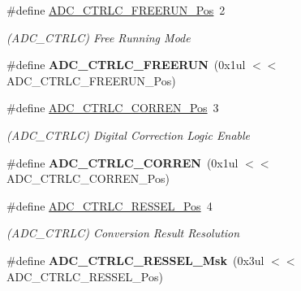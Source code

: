 \begin{DoxyCompactItemize}
\item 
\hypertarget{group___s_a_m_l21___a_d_c_gaf797b45fb63c9c66ebcf3eaa16721590}{}\#define \hyperlink{group___s_a_m_l21___a_d_c_gaf797b45fb63c9c66ebcf3eaa16721590}{A\+D\+C\+\_\+\+C\+T\+R\+L\+C\+\_\+\+F\+R\+E\+E\+R\+U\+N\+\_\+\+Pos}~2\label{group___s_a_m_l21___a_d_c_gaf797b45fb63c9c66ebcf3eaa16721590}

\begin{DoxyCompactList}\small\item\em (A\+D\+C\+\_\+\+C\+T\+R\+L\+C) Free Running Mode \end{DoxyCompactList}\item 
\hypertarget{group___s_a_m_l21___a_d_c_ga88d484b091ca0e7ee7945cc64b936b11}{}\#define {\bfseries A\+D\+C\+\_\+\+C\+T\+R\+L\+C\+\_\+\+F\+R\+E\+E\+R\+U\+N}~(0x1ul $<$$<$ A\+D\+C\+\_\+\+C\+T\+R\+L\+C\+\_\+\+F\+R\+E\+E\+R\+U\+N\+\_\+\+Pos)\label{group___s_a_m_l21___a_d_c_ga88d484b091ca0e7ee7945cc64b936b11}

\item 
\hypertarget{group___s_a_m_l21___a_d_c_ga432d3fdbfce5dd79a4eff17b3f8a2c50}{}\#define \hyperlink{group___s_a_m_l21___a_d_c_ga432d3fdbfce5dd79a4eff17b3f8a2c50}{A\+D\+C\+\_\+\+C\+T\+R\+L\+C\+\_\+\+C\+O\+R\+R\+E\+N\+\_\+\+Pos}~3\label{group___s_a_m_l21___a_d_c_ga432d3fdbfce5dd79a4eff17b3f8a2c50}

\begin{DoxyCompactList}\small\item\em (A\+D\+C\+\_\+\+C\+T\+R\+L\+C) Digital Correction Logic Enable \end{DoxyCompactList}\item 
\hypertarget{group___s_a_m_l21___a_d_c_gae22355e08b3e4d35617ca4d070f2a893}{}\#define {\bfseries A\+D\+C\+\_\+\+C\+T\+R\+L\+C\+\_\+\+C\+O\+R\+R\+E\+N}~(0x1ul $<$$<$ A\+D\+C\+\_\+\+C\+T\+R\+L\+C\+\_\+\+C\+O\+R\+R\+E\+N\+\_\+\+Pos)\label{group___s_a_m_l21___a_d_c_gae22355e08b3e4d35617ca4d070f2a893}

\item 
\hypertarget{group___s_a_m_l21___a_d_c_ga8e61247becfe523ab5564856a3896df0}{}\#define \hyperlink{group___s_a_m_l21___a_d_c_ga8e61247becfe523ab5564856a3896df0}{A\+D\+C\+\_\+\+C\+T\+R\+L\+C\+\_\+\+R\+E\+S\+S\+E\+L\+\_\+\+Pos}~4\label{group___s_a_m_l21___a_d_c_ga8e61247becfe523ab5564856a3896df0}

\begin{DoxyCompactList}\small\item\em (A\+D\+C\+\_\+\+C\+T\+R\+L\+C) Conversion Result Resolution \end{DoxyCompactList}\item 
\hypertarget{group___s_a_m_l21___a_d_c_ga4a23b86153766fc18651deb083ac4242}{}\#define {\bfseries A\+D\+C\+\_\+\+C\+T\+R\+L\+C\+\_\+\+R\+E\+S\+S\+E\+L\+\_\+\+Msk}~(0x3ul $<$$<$ A\+D\+C\+\_\+\+C\+T\+R\+L\+C\+\_\+\+R\+E\+S\+S\+E\+L\+\_\+\+Pos)\label{group___s_a_m_l21___a_d_c_ga4a23b86153766fc18651deb083ac4242}


\end{DoxyCompactItemize}
